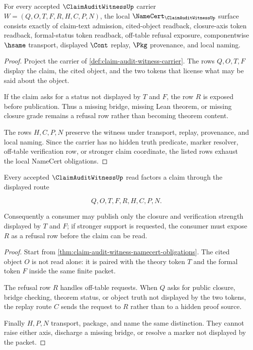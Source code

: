 \begin{theorem}
\label{thm:claim-audit-witness-namecert-obligations}
For every accepted $\ClaimAuditWitnessUp$ carrier $W=(Q,O,T,F,R,H,C,P,N)$, the local $\NameCert_{\ClaimAuditWitnessUp}$ surface consists exactly of claim-text admission, cited-object readback, closure-axis token readback, formal-status token readback, off-table refusal exposure, componentwise $\hsame$ transport, displayed $\Cont$ replay, $\Pkg$ provenance, and local naming.
\end{theorem}
\begin{proof}
Project the carrier of \autoref{def:claim-audit-witness-carrier}. The rows $Q,O,T,F$ display the claim, the cited object, and the two tokens that license what may be said about the object.

If the claim asks for a status not displayed by $T$ and $F$, the row $R$ is exposed before publication. Thus a missing bridge, missing Lean theorem, or missing closure grade remains a refusal row rather than becoming theorem content.

The rows $H,C,P,N$ preserve the witness under transport, replay, provenance, and local naming. Since the carrier has no hidden truth predicate, marker resolver, off-table verification row, or stronger claim coordinate, the listed rows exhaust the local NameCert obligations.
\end{proof}

\begin{theorem}
\label{thm:claim-audit-witness-two-axis-nonescape}
Every accepted $\ClaimAuditWitnessUp$ read factors a claim through the displayed route

$$
Q,O,T,F,R,H,C,P,N.
$$

Consequently a consumer may publish only the closure and verification strength displayed by $T$ and $F$; if stronger support is requested, the consumer must expose $R$ as a refusal row before the claim can be read.
\end{theorem}
\begin{proof}
Start from \autoref{thm:claim-audit-witness-namecert-obligations}. The cited object $O$ is not read alone: it is paired with the theory token $T$ and the formal token $F$ inside the same finite packet.

The refusal row $R$ handles off-table requests. When $Q$ asks for public closure, bridge checking, theorem status, or object truth not displayed by the two tokens, the replay route $C$ sends the request to $R$ rather than to a hidden proof source.

Finally $H,P,N$ transport, package, and name the same distinction. They cannot raise either axis, discharge a missing bridge, or resolve a marker not displayed by the packet.
\end{proof}

